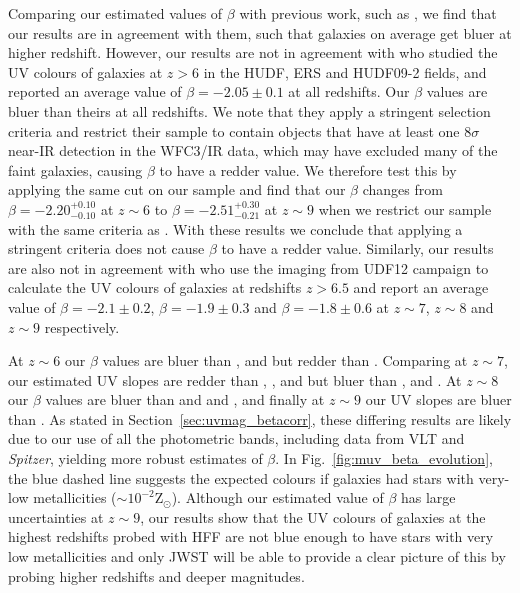 \documentclass[twocolumn]{aastex63}
\begin{document}
Comparing our estimated values of $\beta$ with previous work, such as \citealt{Finkelstein2012, Bouwens2012, Bouwens2014b}, we find that our results are in agreement with them, such that galaxies on average get bluer at higher redshift. However, our results are not in agreement with \citet{Dunlop2012} who studied the UV colours of galaxies at $z>6$ in the HUDF, ERS and HUDF09-2 fields, and reported an average value of $\beta=-2.05\pm0.1$ at all redshifts. Our $\beta$ values are bluer than theirs at all redshifts. We note that they apply a stringent selection criteria and restrict their sample to contain objects that have at least one $8\sigma$ near-IR detection in the WFC3/IR data, which may have excluded many of the faint galaxies, causing $\beta$ to have a redder value. We therefore test this by applying the same cut on our sample and find that our $\beta$ changes from $\beta=-2.20_{-0.10}^{+0.10}$ at $z\sim6$ to $\beta=-2.51_{-0.21}^{+0.30}$ at $z\sim9$ when we restrict our sample with the same criteria as \citet{Dunlop2012}. With these results we conclude that applying a stringent criteria does not cause $\beta$ to have a redder value. Similarly, our results are also not in agreement with \citet{Dunlop2013} who use the imaging from UDF12 campaign to calculate the UV colours of galaxies at redshifts $z>6.5$ and report an average value of $\beta=-2.1\pm0.2$, $\beta=-1.9\pm0.3$ and $\beta=-1.8\pm0.6$ at $z\sim7$, $z\sim8$ and $z\sim9$ respectively.

At $z\sim6$ our $\beta$ values are bluer than \citet{Wilkins2011}, \citet{Finkelstein2012} and \citet{Dunlop2012} but redder than \citet{Bouwens2012}. Comparing at $z\sim7$, our estimated UV slopes are redder than \citet{Finkelstein2010}, \citet{Finkelstein2012}, \citet{Bouwens2012} and \citet{Wilkins2011} but bluer than \citet{Dunlop2012}, \citet{Dunlop2013} and \citet{Bouwens2014b}. At $z\sim8$ our $\beta$ values are bluer than \citet{Finkelstein2012} and \citet{Dunlop2013} and \citet{Bouwens2014}, and finally at $z\sim9$ our UV slopes are bluer than \citet{Dunlop2013}. As stated in Section~\ref{sec:uvmag_betacorr}, these differing results are likely due to our use of all the photometric bands, including data from VLT and \textit{Spitzer}, yielding more robust estimates of $\beta$. In Fig.~\ref{fig:muv_beta_evolution}, the blue dashed line suggests the expected colours if galaxies had stars with very-low metallicities ($\sim10^{-2}\mathrm{Z_{\odot}}$). Although our estimated value of $\beta$ has large uncertainties at $z\sim9$, our results show that the UV colours of galaxies at the highest redshifts probed with HFF are not blue enough to have stars with very low metallicities and only JWST will be able to provide a clear picture of this by probing higher redshifts and deeper magnitudes.
\end{document}
